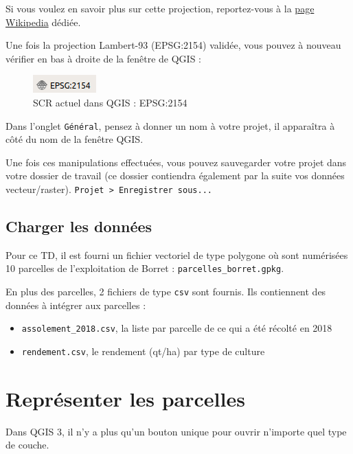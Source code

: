 Si vous voulez en savoir plus sur cette projection, reportez-vous à la
\href{https://fr.wikipedia.org/wiki/Projection_conique_conforme_de_Lambert}{page
Wikipedia} dédiée.

Une fois la projection Lambert-93 (EPSG:2154) validée, vous pouvez à
nouveau vérifier en bas à droite de la fenêtre de QGIS :

\begin{figure}[htbp]
\centering
\includegraphics{figures/EPSG2154.png}
\caption{SCR actuel dans QGIS : EPSG:2154}
\end{figure}

Dans l'onglet \texttt{Général}, pensez à donner un nom à votre projet,
il apparaîtra à côté du nom de la fenêtre QGIS.

Une fois ces manipulations effectuées, vous pouvez sauvegarder votre
projet dans votre dossier de travail (ce dossier contiendra également
par la suite vos données vecteur/raster).
\texttt{Projet\ \textgreater{}\ Enregistrer\ sous...}

\subsection{Charger les données}\label{charger-les-donnuxe9es}

Pour ce TD, il est fourni un fichier vectoriel de type polygone où sont
numérisées 10 parcelles de l'exploitation de Borret :
\texttt{parcelles\_borret.gpkg}.

En plus des parcelles, 2 fichiers de type \texttt{csv} sont fournis. Ils
contiennent des données à intégrer aux parcelles :

\begin{itemize}
\tightlist
\item
  \texttt{assolement\_2018.csv}, la liste par parcelle de ce qui a été
  récolté en 2018
\item
  \texttt{rendement.csv}, le rendement (qt/ha) par type de culture
\end{itemize}

\section{Représenter les parcelles}\label{repruxe9senter-les-parcelles}

Dans QGIS 3, il n'y a plus qu'un bouton unique pour ouvrir n'importe
quel type de couche.

